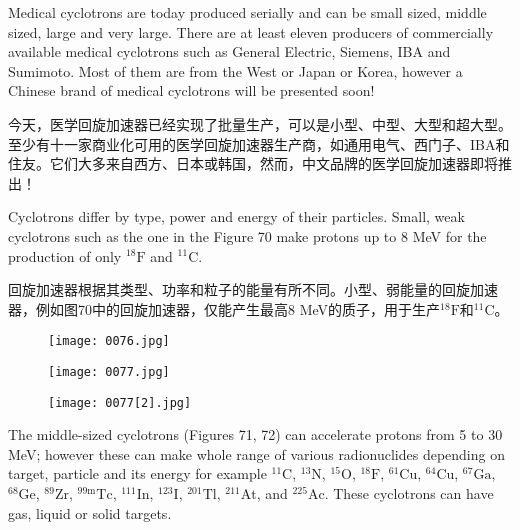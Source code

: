 \documentclass[dvipsnames, svgnames,a4paper,11pt]{article}
\begin{document}
Medical cyclotrons are today produced serially and can be small sized, middle sized, large and very large. There are at least eleven producers of commercially available medical cyclotrons such as General Electric, Siemens, IBA and Sumimoto. Most of them are from the West or Japan or Korea, however a Chinese brand of medical cyclotrons will be presented soon!

今天，医学回旋加速器已经实现了批量生产，可以是小型、中型、大型和超大型。至少有十一家商业化可用的医学回旋加速器生产商，如通用电气、西门子、IBA和住友。它们大多来自西方、日本或韩国，然而，中文品牌的医学回旋加速器即将推出！
 
Cyclotrons differ by type, power and energy of their particles. Small, weak cyclotrons such as the one in the Figure 70 make protons up to 8 MeV for the production of only $^{18}\text{F}$ and $^{11}\text{C}$.

回旋加速器根据其类型、功率和粒子的能量有所不同。小型、弱能量的回旋加速器，例如图70中的回旋加速器，仅能产生最高8 MeV的质子，用于生产$^{18}\text{F}$和$^{11}\text{C}$。

\begin{figure}[ht]
    \centering
    \texttt{[image: 0076.jpg]}
     \label{fig70}
\end{figure}

\begin{figure}[ht]
    \centering
    \texttt{[image: 0077.jpg]}
     \label{fig71}
\end{figure}

\begin{figure}[H]
    \centering
    \texttt{[image: 0077[2].jpg]}
     \label{fig72}
\end{figure}

The middle-sized cyclotrons (Figures 71, 72) can accelerate protons from 5 to 30 MeV; however these can make whole range of various radionuclides depending on target, particle and its energy for example $^{11}\text{C}$, $^{13}\text{N}$, $^{15}\text{O}$, $^{18}\text{F}$, $^{61}\text{Cu}$, $^{64}\text{Cu}$, $^{67}\text{Ga}$, $^{68}\text{Ge}$, $^{89}\text{Zr}$, $^{99\text{m}}\text{Tc}$, $^{111}\text{In}$, $^{123}\text{I}$, $^{201}\text{Tl}$, $^{211}\text{At}$, and $^{225}\text{Ac}$. These cyclotrons can have gas, liquid or solid targets.
\end{document}
